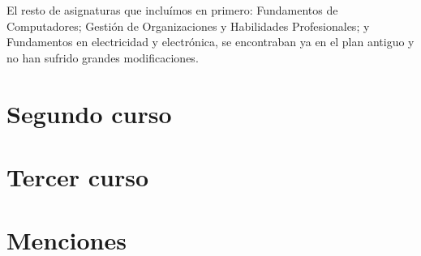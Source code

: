 El resto de asignaturas que incluímos en primero:
Fundamentos de Computadores;
Gestión de Organizaciones y Habilidades Profesionales; y
Fundamentos en electricidad y electrónica,
se encontraban ya en el plan antiguo y no han sufrido grandes modificaciones.



\section{Segundo curso}

\section{Tercer curso}

\section{Menciones}


